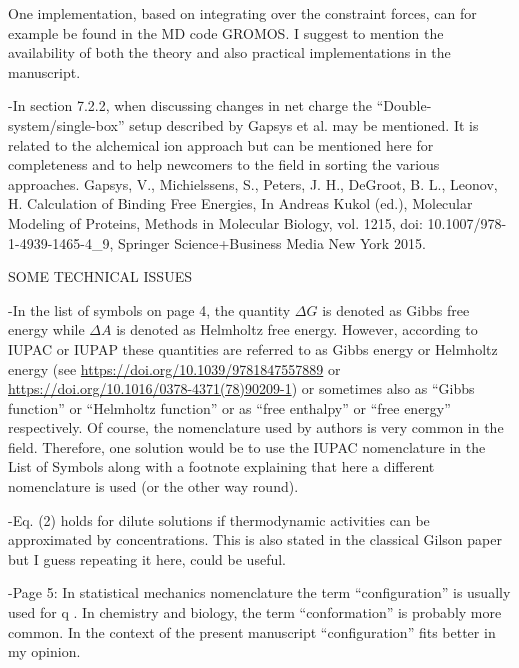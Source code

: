 \documentclass[10pt,stdletter]{newlfm}
\begin{document}
\begin{newlfm}
One implementation, based on integrating over the constraint forces, can for example be found in the MD code GROMOS. I suggest to mention the availability of both the theory and also practical implementations in the manuscript.

\color[red]{We have revised this text in 7.1, making it clear that the corrections are known, that different programs vary in their implementation of the corrections, and that users should check the user manuals if they have bond lengths that both change and are constrainted}

-In section 7.2.2, when discussing changes in net charge the “Double-system/single-box” setup described by Gapsys et al. may be mentioned. It is related to the alchemical ion approach but can be mentioned here for completeness and to help newcomers to the field in sorting the various approaches. Gapsys, V., Michielssens, S., Peters, J. H., DeGroot, B. L., Leonov, H. Calculation of Binding Free Energies, In Andreas Kukol (ed.), Molecular Modeling of Proteins, Methods in Molecular Biology, vol. 1215, doi: 10.1007/978-1-4939-1465-4\_9, Springer Science+Business Media New York 2015.

SOME TECHNICAL ISSUES

-In the list of symbols on page 4, the quantity $\Delta G$ is denoted as Gibbs free energy while $\Delta A$ is denoted as Helmholtz free energy. However, according to IUPAC or IUPAP these quantities are referred to as Gibbs energy or Helmholtz energy (see \url{https://doi.org/10.1039/9781847557889} or \url{https://doi.org/10.1016/0378-4371(78)90209-1}) or sometimes also as “Gibbs function” or “Helmholtz function” or as “free enthalpy” or “free energy” respectively. Of course, the nomenclature used by authors is very common in the field. Therefore, one solution would be to use the IUPAC nomenclature in the List of Symbols along with a footnote explaining that here a different nomenclature is used (or the other way round).

\color[red]{MRS: we have added the less-commonly used but also correct terms as alternate names for these quantities in the list of symbols.}

-Eq. (2) holds for dilute solutions if thermodynamic activities can be approximated by concentrations. This is also stated in the classical Gilson paper but I guess repeating it here, could be useful.

-Page 5: In statistical mechanics nomenclature the term “configuration” is usually used for q ⃑. In chemistry and biology, the term “conformation” is probably more common. In the context of the present manuscript “configuration” fits better in my opinion.


\end{newlfm}
\end{document}
